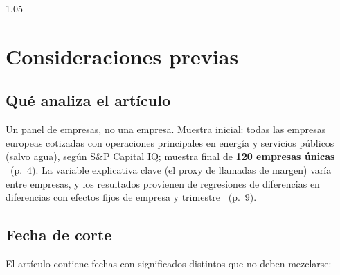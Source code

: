 \documentclass{article} %
\newcommand{\pg}[1]{(p.~#1)}
\begin{document}

\clearpage
\begingroup
\begin{spacing}{1.05} %
\fontsize{12pt}{15pt}\selectfont

\tableofcontents

\end{spacing}
\endgroup
\clearpage 

\newpage

\pagestyle{miestilo}


\section{Consideraciones previas}

    \subsection{Qué analiza el artículo} 
    Un panel de empresas, no una empresa. 
    Muestra inicial: todas las empresas europeas cotizadas con operaciones principales en energía 
    y servicios públicos (salvo agua), según S\&P Capital IQ; muestra final de \textbf{120 empresas únicas} 
    \ \pg{4}. La variable explicativa clave (el proxy de llamadas de margen) varía entre empresas, y 
    los resultados provienen de regresiones de diferencias en diferencias con efectos fijos de empresa y trimestre \ \pg{9}.

    \subsection{Fecha de corte} 

    El artículo contiene fechas con significados distintos que no deben mezclarse:
\end{document}
